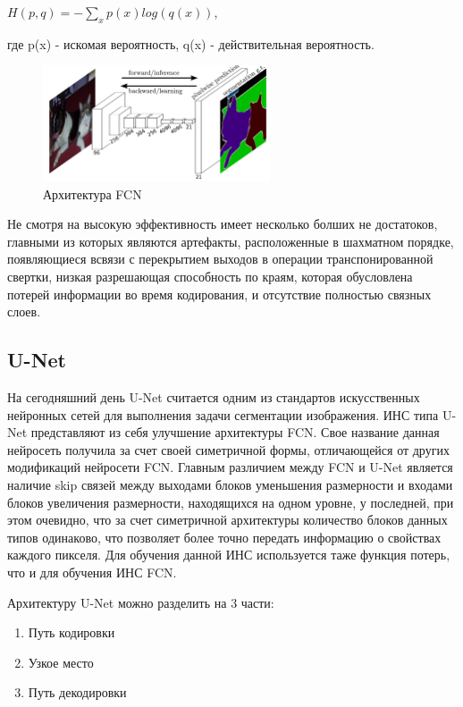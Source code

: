\documentclass[bachelor, och, coursework]{shiza}
\begin{document}
\begin{center}
    $H(p, q) = -\sum\limits_{x}p(x)log(q(x))$, 
\end{center}
где p(x) - искомая вероятность, q(x) - действительная вероятность.

\begin{figure}[H]
    \centering
    \includegraphics[width=0.6\textwidth]{9}
    \caption{Архитектура FCN}
    \label{fig:img1}
\end{figure}

Не смотря на высокую эффективность имеет несколько болших не достатоков, главными из которых являются артефакты, расположенные в шахматном
порядке, появляющиеся всвязи с перекрытием выходов в операции транспонированной свертки, низкая разрешающая способность по краям, которая
обусловлена потерей информации во время кодирования, и отсутствие полностью связных слоев.

\subsection{U-Net}

На сегодняшний день U-Net считается одним из стандартов искусственных нейронных сетей для выполнения задачи сегментации изображения. ИНС типа 
U-Net представляют из себя улучшение архитектуры FCN. Свое название данная нейросеть получила за счет своей симетричной формы, отличающейся от 
других модификаций нейросети FCN. Главным различием между FCN и U-Net является наличие skip связей между выходами блоков уменьшения размерности 
и входами блоков увеличения размерности, находящихся на одном уровне, у последней, при этом очевидно, что за счет симетричной архитектуры количество 
блоков данных типов одинаково, что позволяет более точно передать информацию о свойствах каждого пикселя. Для обучения данной ИНС используется таже 
функция потерь, что и для обучения ИНС FCN.

Архитектуру U-Net можно разделить на 3 части:

\begin{enumerate}
    \item Путь кодировки
    \item Узкое место 
    \item Путь декодировки
\end{enumerate}
\end{document}
